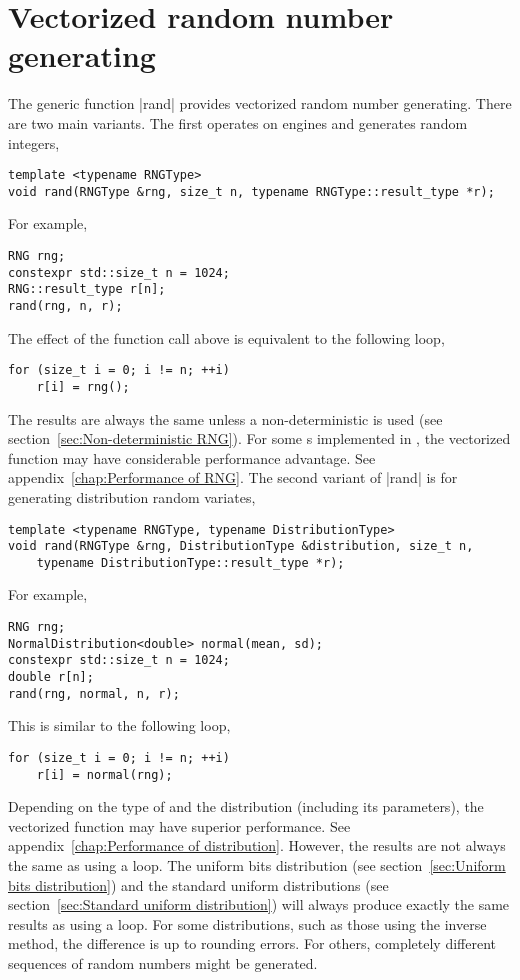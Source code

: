 \section{Vectorized random number generating}
\label{sec:Vectorized random number generating}

The generic function |rand| provides vectorized random number generating. There
are two main variants. The first operates on \rng engines and generates random
integers,
\begin{verbatim}
template <typename RNGType>
void rand(RNGType &rng, size_t n, typename RNGType::result_type *r);
\end{verbatim}
For example,
\begin{verbatim}
RNG rng;
constexpr std::size_t n = 1024;
RNG::result_type r[n];
rand(rng, n, r);
\end{verbatim}
The effect of the function call above is equivalent to the following loop,
\begin{verbatim}
for (size_t i = 0; i != n; ++i)
    r[i] = rng();
\end{verbatim}
The results are always the same unless a non-deterministic \rng is used (see
section~\ref{sec:Non-deterministic RNG}). For some \rng{}s implemented in
\mckl, the vectorized function may have considerable performance advantage. See
appendix~\ref{chap:Performance of RNG}. The second variant of |rand| is for
generating distribution random variates,
\begin{verbatim}
template <typename RNGType, typename DistributionType>
void rand(RNGType &rng, DistributionType &distribution, size_t n,
    typename DistributionType::result_type *r);
\end{verbatim}
For example,
\begin{verbatim}
RNG rng;
NormalDistribution<double> normal(mean, sd);
constexpr std::size_t n = 1024;
double r[n];
rand(rng, normal, n, r);
\end{verbatim}
This is similar to the following loop,
\begin{verbatim}
for (size_t i = 0; i != n; ++i)
    r[i] = normal(rng);
\end{verbatim}
Depending on the type of \rng and the distribution (including its parameters),
the vectorized function may have superior performance. See
appendix~\ref{chap:Performance of distribution}. However, the results are not
always the same as using a loop. The uniform bits distribution (see
section~\ref{sec:Uniform bits distribution}) and the standard uniform
distributions (see section~\ref{sec:Standard uniform distribution}) will always
produce exactly the same results as using a loop. For some distributions, such
as those using the inverse method, the difference is up to rounding errors. For
others, completely different sequences of random numbers might be generated.

